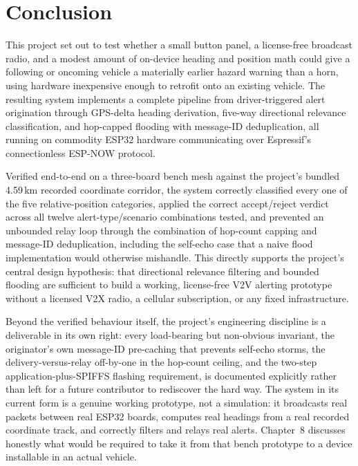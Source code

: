 \documentclass[12pt,a4paper]{report}
\begin{document}
\chapter{Conclusion}
This project set out to test whether a small button panel, a license-free broadcast radio, and a modest amount of on-device heading and position math could give a following or oncoming vehicle a materially earlier hazard warning than a horn, using hardware inexpensive enough to retrofit onto an existing vehicle. The resulting system implements a complete pipeline from driver-triggered alert origination through GPS-delta heading derivation, five-way directional relevance classification, and hop-capped flooding with message-ID deduplication, all running on commodity ESP32 hardware communicating over Espressif's connectionless ESP-NOW protocol.

Verified end-to-end on a three-board bench mesh against the project's bundled 4.59\,km recorded coordinate corridor, the system correctly classified every one of the five relative-position categories, applied the correct accept/reject verdict across all twelve alert-type/scenario combinations tested, and prevented an unbounded relay loop through the combination of hop-count capping and message-ID deduplication, including the self-echo case that a naive flood implementation would otherwise mishandle. This directly supports the project's central design hypothesis: that directional relevance filtering and bounded flooding are sufficient to build a working, license-free V2V alerting prototype without a licensed V2X radio, a cellular subscription, or any fixed infrastructure.

Beyond the verified behaviour itself, the project's engineering discipline is a deliverable in its own right: every load-bearing but non-obvious invariant, the originator's own message-ID pre-caching that prevents self-echo storms, the delivery-versus-relay off-by-one in the hop-count ceiling, and the two-step application-plus-SPIFFS flashing requirement, is documented explicitly rather than left for a future contributor to rediscover the hard way. The system in its current form is a genuine working prototype, not a simulation: it broadcasts real packets between real ESP32 boards, computes real headings from a real recorded coordinate track, and correctly filters and relays real alerts. Chapter~8 discusses honestly what would be required to take it from that bench prototype to a device installable in an actual vehicle.
\end{document}
